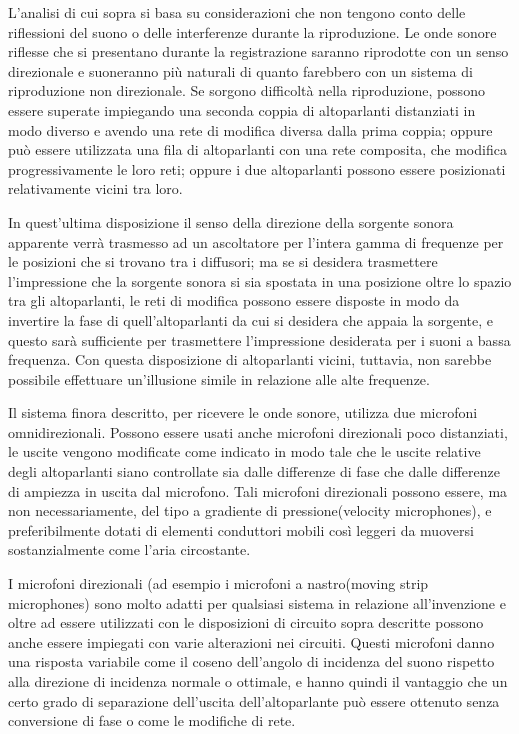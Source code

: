 \documentclass[11pt]{article}
\begin{document}
\begin{multicols*}{2}
L'analisi di cui sopra si basa su considerazioni che non tengono conto delle riflessioni del suono o delle interferenze durante la riproduzione. Le onde sonore riflesse che si presentano durante la registrazione saranno riprodotte con un senso direzionale e suoneranno più naturali di quanto farebbero con un sistema di riproduzione non direzionale. Se sorgono difficoltà nella riproduzione, possono essere superate impiegando una seconda coppia di altoparlanti distanziati in modo diverso e avendo una rete di modifica diversa dalla prima coppia; oppure può essere utilizzata una fila di altoparlanti con una rete composita, che modifica progressivamente le loro reti; oppure i due altoparlanti possono essere posizionati relativamente vicini tra loro.

In quest'ultima disposizione il senso della direzione della sorgente sonora apparente verrà trasmesso ad un ascoltatore per l'intera gamma di frequenze per le posizioni che si trovano tra i diffusori; ma se si desidera trasmettere l'impressione che la sorgente sonora si sia spostata in una posizione oltre lo spazio tra gli altoparlanti, le reti di modifica possono essere disposte in modo da invertire la fase di quell’altoparlanti da cui si desidera che appaia la sorgente, e questo sarà sufficiente per trasmettere l'impressione desiderata per i suoni a bassa frequenza. Con questa disposizione di altoparlanti vicini, tuttavia, non sarebbe possibile effettuare un'illusione simile in relazione alle alte frequenze.

Il sistema finora descritto, per ricevere le onde sonore, utilizza due microfoni omnidirezionali. Possono essere usati anche microfoni direzionali poco distanziati, le uscite vengono modificate come indicato in modo tale che le uscite relative degli altoparlanti siano controllate sia dalle differenze di fase che dalle differenze di ampiezza in uscita dal microfono. Tali microfoni direzionali possono essere, ma non necessariamente, del tipo a gradiente di pressione(velocity microphones), e preferibilmente dotati di elementi conduttori mobili così leggeri da muoversi sostanzialmente come l'aria circostante.

I microfoni direzionali (ad esempio i microfoni a nastro(moving strip microphones) sono molto adatti per qualsiasi sistema in relazione all'invenzione e oltre ad essere utilizzati con le disposizioni di circuito sopra descritte possono anche essere impiegati con varie alterazioni nei circuiti. Questi microfoni danno una risposta variabile come il coseno dell'angolo di incidenza del suono rispetto alla direzione di incidenza normale o ottimale, e hanno quindi il vantaggio che un certo grado di separazione dell'uscita dell'altoparlante può essere ottenuto senza conversione di fase o come le modifiche di rete.


\end{multicols*}
\end{document}
